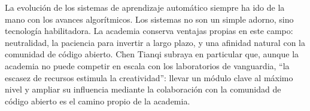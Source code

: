 La evolución de los sistemas de aprendizaje automático siempre ha ido de la mano con los avances algorítmicos. Los sistemas no son un simple adorno, sino tecnología habilitadora. La academia conserva ventajas propias en este campo: neutralidad, la paciencia para invertir a largo plazo, y una afinidad natural con la comunidad de código abierto. Chen Tianqi subraya en particular que, aunque la academia no puede competir en escala con los laboratorios de vanguardia, ``la escasez de recursos estimula la creatividad'': llevar un módulo clave al máximo nivel y ampliar su influencia mediante la colaboración con la comunidad de código abierto es el camino propio de la academia.
